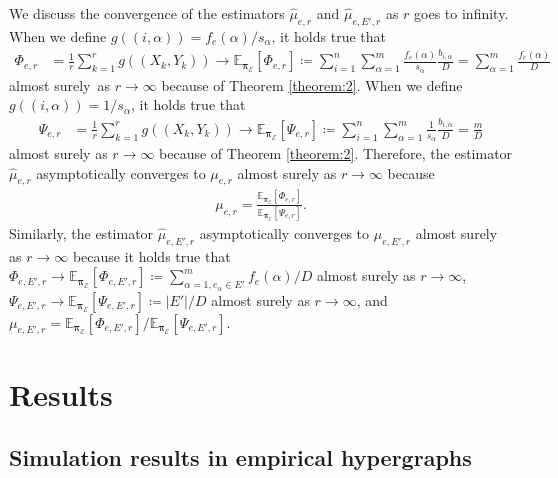 We discuss the convergence of the estimators $\hat{\mu}_{e, r}$ and $\hat{\mu}_{e, E', r}$ as $r$ goes to infinity.
When we define $g((i, \alpha)) = f_e(\alpha) / s_{\alpha}$, it holds true that
\begin{align*}
\Phi_{e, r} &= \frac{1}{r} \sum_{k=1}^r g((X_k, Y_k)) \to \mathbb{E}_{\bm{\pi}_{\mathcal{E}}}[\Phi_{e, r}] \coloneq \sum_{i=1}^n \sum_{\alpha=1}^m \frac{f_e(\alpha)}{s_{\alpha}} \frac{b_{i, \alpha}}{D} = \sum_{\alpha=1}^m \frac{f_e(\alpha)}{D}
\end{align*}
almost surely\ as $r \to \infty$ because of Theorem \ref{theorem:2}.
When we define $g((i, \alpha)) = 1 / s_{\alpha}$, it holds true that
\begin{align*}
\Psi_{e, r} &= \frac{1}{r} \sum_{k=1}^r g((X_k, Y_k)) \to \mathbb{E}_{\bm{\pi}_{\mathcal{E}}}[\Psi_{e, r}] \coloneq \sum_{i=1}^n \sum_{\alpha=1}^m \frac{1}{s_{\alpha}} \frac{b_{i, \alpha}}{D} = \frac{m}{D}
\end{align*}
almost surely as $r \to \infty$ because of Theorem \ref{theorem:2}.
Therefore, the estimator $\hat{\mu}_{e, r}$ asymptotically converges to $\mu_{e, r}$ almost surely as $r \to \infty$ because 
\begin{align*}
\mu_{e, r} = \frac{\mathbb{E}_{\bm{\pi}_{\mathcal{E}}}[\Phi_{e, r}]}{\mathbb{E}_{\bm{\pi}_{\mathcal{E}}}[\Psi_{e, r}]}.
\end{align*}
Similarly, the estimator $\hat{\mu}_{e, E', r}$ asymptotically converges to $\mu_{e, E', r}$ almost surely as $r \to \infty$ because it holds true that $\Phi_{e, E', r} \to \mathbb{E}_{\bm{\pi}_{\mathcal{E}}}[\Phi_{e, E', r}] \coloneq \sum_{\alpha=1, e_{\alpha} \in E'}^m f_e(\alpha) / D$ almost surely as $r \to \infty$, $\Psi_{e, E', r} \to \mathbb{E}_{\bm{\pi}_{\mathcal{E}}}[\Psi_{e, E', r}] \coloneq |E'| / D$ almost surely as $r \to \infty$, and $\mu_{e, E', r} = \mathbb{E}_{\bm{\pi}_{\mathcal{E}}}[\Phi_{e, E', r}] / \mathbb{E}_{\bm{\pi}_{\mathcal{E}}}[\Psi_{e, E', r}]$.

\section{Results} \label{section:3}

\subsection{Simulation results in empirical hypergraphs}
\label{section:3.1}


